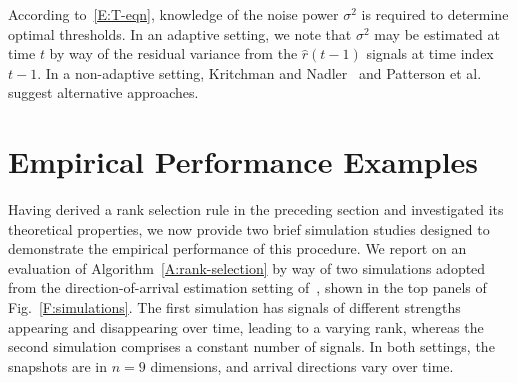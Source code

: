 \documentclass[final]{IEEEtran} %
\begin{document}
According to~\eqref{E:T-eqn}, knowledge of the noise power $\sigma^2$ is required to determine optimal thresholds.  In an adaptive setting, we note that $\sigma^2$ may be estimated at time $t$ by way of the residual variance from the $\hat r(t-1)$ signals at time index $t-1$.  In a non-adaptive setting, Kritchman and Nadler~\cite{kritchman2008dnc} and Patterson et al.~\cite{patterson2006psa} suggest alternative approaches.


\section{Empirical Performance Examples}
\label{S:emp-perf}

Having derived a rank selection rule in the preceding section and investigated its theoretical properties, we now provide two brief simulation studies designed to demonstrate the empirical performance of this procedure.  We report on an evaluation of Algorithm~\ref{A:rank-selection} by way of two simulations adopted from the direction-of-arrival estimation setting of~\cite{kavcic1996are}, shown in the top panels of Fig.~\ref{F:simulations}.  The first simulation has signals of different strengths appearing and disappearing over time, leading to a varying rank, whereas the second simulation comprises a constant number of signals.  In both settings, the snapshots are in $n = 9$ dimensions, and arrival directions vary over time.
\end{document}
